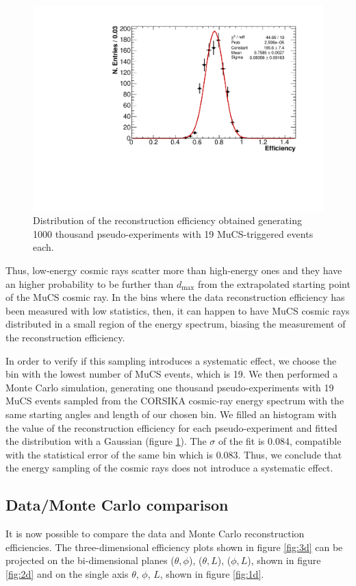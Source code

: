 \documentclass[a4paper]{scrartcl}
\begin{document}
\begin{figure}[htbp]
  \begin{center}
    \includegraphics[width=0.7\linewidth]{figures/sampling.pdf}
    \caption{Distribution of the reconstruction efficiency obtained generating 1000 thousand pseudo-experiments with 19 MuCS-triggered events each.} \label{fig:sampling}
  \end{center}
\end{figure}

Thus, low-energy cosmic rays scatter more than high-energy ones and they have an higher probability to be further than $d_{\mathrm{max}}$ from the extrapolated starting point of the MuCS cosmic ray. In the bins where the data reconstruction efficiency has been measured with low statistics, then, it can happen to have MuCS cosmic rays distributed in a small region of the energy spectrum, biasing the measurement of the reconstruction efficiency.

In order to verify if this sampling introduces a systematic effect, we choose the bin with the lowest number of MuCS events, which is 19. We then performed a Monte Carlo simulation, generating one thousand pseudo-experiments with 19 MuCS events sampled from the CORSIKA cosmic-ray energy spectrum with the same starting angles and length of our chosen bin. We filled an histogram with the value of the reconstruction efficiency for each pseudo-experiment and fitted the distribution with a Gaussian (figure \ref{fig:sampling}). The $\sigma$ of the fit is $0.084$, compatible with the statistical error of the same bin which is $0.083$. Thus, we conclude that the energy sampling of the cosmic rays does not introduce a systematic effect.

\subsection{Data/Monte Carlo comparison}
It is now possible to compare the data and Monte Carlo reconstruction efficiencies. The three-dimensional efficiency plots shown in figure \ref{fig:3d} can be projected on the bi-dimensional planes ($\theta,\phi$), ($\theta,L$), ($\phi,L$), shown in figure \ref{fig:2d} and on the single axis $\theta$, $\phi$, $L$, shown in figure \ref{fig:1d}.
\end{document}
